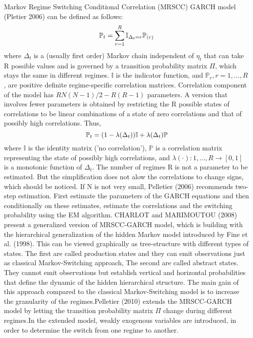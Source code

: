 \documentclass[a4paper,12pt]{article}
\begin{document}
\noindent Markov Regime Switching Conditional Correlation (MRSCC) GARCH model (Pletier 2006) can be defined as follows:\\
\begin{equation}
\centering
\mathbb{P}_t = \sum\limits^{R}_{r=1}\mathbb{I}_{\Delta_t=r}\mathbb{P}_{(r)}
\end{equation}
where $\Delta_t$ is a (usually first order) Markov chain independent of $\eta_t$ that can take R possible values and is governed by a transition probability matrix $\Pi$, which stays the same in different regimes. $\mathbb{I}$ is the indicator function, and $\mathbb{P}_r, r = 1, \ldots, R$, are positive definite regime-specific correlation matrices. Correlation component of the model has $RN(N-1)/2-R(R-1)$ parameters. A version that involves fewer parameters is obtained by restricting the R possible states of correlations to be linear combinations of a state of zero correlations and that of possibly high correlations. Thus,
\begin{equation}
\centering
\mathbb{P}_t = (1 - \lambda(\Delta_t))\mathbb{I} + \lambda(\Delta_t)\mathbb{P}
\end{equation}
where $\mathbb{I}$ is the identity matrix ('no correlation'), $\mathbb{P}$ is a correlation matrix representing the state of possibly high correlations, and $\lambda(\cdot): {1, \ldots, R}\rightarrow[0, 1]$ is a monotonic function of $\Delta_t$. The number of regimes R is not a parameter to be estimated. But the simplification does not alow the correlations to change signs, which should be noticed. If N is not very small, Pelletier (2006) recommends two-step estimation. First estimate the parameters of the GARCH equations and then conditionally on these estimates, estimate the correlations and the switching probability using the EM algorithm. CHARLOT and MARIMOUTOU (2008) present a generalized version of MRSCC-GARCH model, which is building with the hierarchical generalization of the hidden Markov model introduced by Fine et al. (1998). This can be viewed graphically as tree-structure with different types of states. The first are called production states and they can emit observations just as classical Markov-Switching approach, The second are called abstract states. They cannot emit observations but establish vertical and horizontal probabilities that define the dynamic of the hidden hierarchical structure. The main gain of this approach compared to the classical Markov-Switching model is to increase the granularity of the regimes.Pelletier (2010) extends the MRSCC-GARCH model by letting the transition probability matrix $\Pi$ change during different regimes.In the extended model, weakly exogenous variables are introduced, in order to determine the switch from one regime to another.
\end{document}
